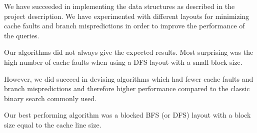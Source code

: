 We have succeeded in implementing the data structures as described in the project description. We have experimented with different layouts for minimizing cache faults and branch mispredictions in order to improve the performance of the queries.

Our algorithms did not always give the expected results. Most surprising was the high number of cache faults when using a DFS layout with a small block size.

However, we did succeed in devising algorithms which had fewer cache faults and branch mispredictions and therefore higher performance compared to the classic binary search commonly used. 

Our best performing algorithm was a blocked BFS (or DFS) layout with a block size equal to the cache line size.